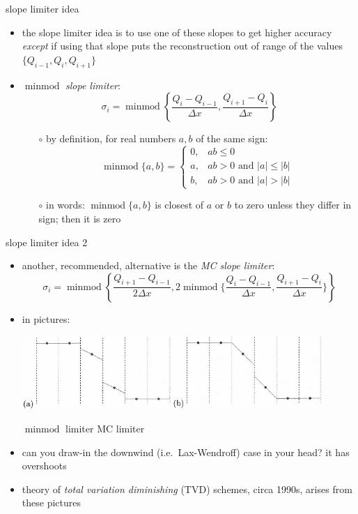 \documentclass[10pt,hyperref,dvipsnames]{beamer}
\newcommand{\minmod}{\operatorname{minmod}}
\begin{document}
\begin{frame}{slope limiter idea}

\begin{itemize}
\item the slope limiter idea is to use one of these slopes to get higher accuracy \emph{except} if using that slope puts the reconstruction out of range of the values $\{Q_{i-1},Q_i,Q_{i+1}\}$
\item \alert{$\minmod$ \emph{slope limiter}:}
    $$\sigma_i = \minmod\left\{\frac{Q_i-Q_{i-1}}{\Delta x},\frac{Q_{i+1}-Q_i}{\Delta x}\right\}$$

    \begin{itemize}
    \item[$\circ$] by definition, for real numbers $a,b$ of the same sign:
        $$\minmod\{a,b\} = \begin{cases} 0, & ab \le 0 \\
                                         a, & ab>0 \text{ and } |a| \le |b| \\
                                         b, & ab>0 \text{ and } |a| > |b| \end{cases}$$
    \item[$\circ$] in words: $\minmod\{a,b\}$ is closest of $a$ or $b$ to zero unless they differ in sign; then it is zero
    \end{itemize}
\end{itemize}
\end{frame}


\begin{frame}{slope limiter idea 2}

\begin{itemize}
\item another, recommended, alternative is the \alert{\emph{MC slope limiter}:}
    $$\sigma_i = \minmod\left\{\frac{Q_{i+1}-Q_{i-1}}{2\Delta x},2\minmod\Big\{\frac{Q_i-Q_{i-1}}{\Delta x},\frac{Q_{i+1}-Q_i}{\Delta x}\Big\}\right\}$$
\item in pictures:

\begin{center}
\includegraphics[width=0.9\textwidth]{figs/leveque6p5}
\end{center}

\hspace{15mm} $\minmod$ limiter \hfill MC limiter \hspace{15mm} \phantom{x}
\item can you draw-in the downwind (i.e.~Lax-Wendroff) case in your head?  it has overshoots
\item theory of \emph{total variation diminishing} (TVD) schemes, circa 1990s, arises from these pictures
\end{itemize}
\end{frame}
\end{document}

